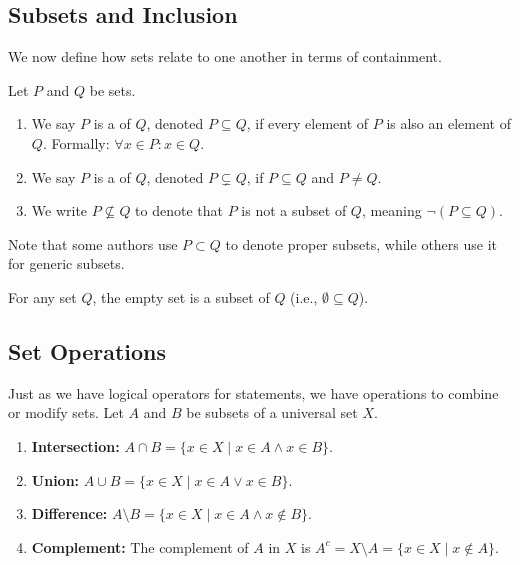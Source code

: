 \subsection{Subsets and Inclusion}

We now define how sets relate to one another in terms of containment.

\begin{definition}
Let $P$ and $Q$ be sets.
\begin{enumerate}
    \item We say $P$ is a  of $Q$, denoted $P \subseteq Q$, if every element of $P$ is also an element of $Q$. Formally: $\forall x \in P : x \in Q$.
    \item We say $P$ is a  of $Q$, denoted $P \subsetneq Q$, if $P \subseteq Q$ and $P \ne Q$. 
    \item We write $P \not\subseteq Q$ to denote that $P$ is not a subset of $Q$, meaning $\neg(P \subseteq Q)$.
\end{enumerate}
\end{definition}

\begin{remark}
Note that some authors use $P \subset Q$ to denote proper subsets, while others use it for generic subsets.
\end{remark}

\begin{claim*}
For any set $Q$, the empty set is a subset of $Q$ (i.e., $\emptyset \subseteq Q$).
\end{claim*}

\subsection{Set Operations}

Just as we have logical operators for statements, we have operations to combine or modify sets. Let $A$ and $B$ be subsets of a universal set $X$.

\begin{enumerate}
    \item \textbf{Intersection:} $A \cap B = \{x \in X \mid x \in A \wedge x \in B\}$.
    \item \textbf{Union:} $A \cup B = \{x \in X \mid x \in A \vee x \in B\}$.
    \item \textbf{Difference:} $A \setminus B = \{x \in X \mid x \in A \wedge x \notin B\}$.
    \item \textbf{Complement:} The complement of $A$ in $X$ is $A^c = X \setminus A = \{x \in X \mid x \notin A\}$.
\end{enumerate}

